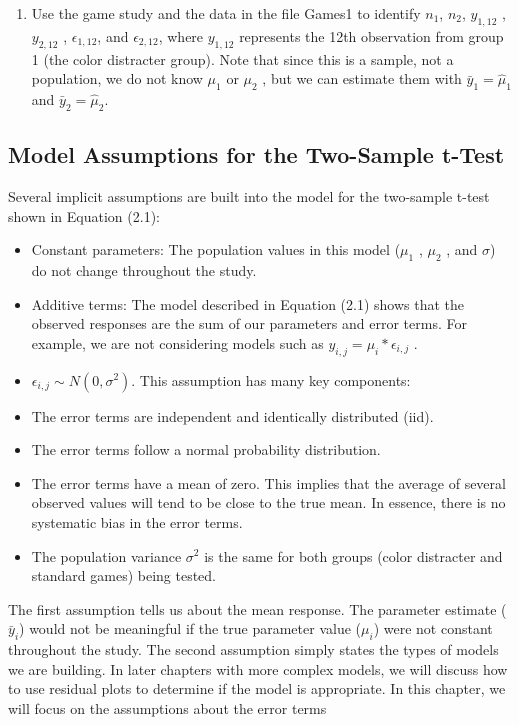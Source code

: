 \documentclass[
]{report}
\providecommand{\tightlist}{%
  \setlength{\itemsep}{0pt}\setlength{\parskip}{0pt}}
\begin{document}
\begin{enumerate}
\def\labelenumi{\arabic{enumi}.}
\setcounter{enumi}{5}
\tightlist
\item
  Use the game study and the data in the file Games1 to identify \(n_1\), \(n_2\), \(y_{1,12}\) , \(y_{2,12}\) , \(\epsilon_{1, 12}\), and \(\epsilon_{2, 12}\),
  where \(y_{1,12}\) represents the 12th observation from group 1 (the color distracter group). Note that since this is a sample, not a population, we do not know \(\mu_1\) or \(\mu_2\) , but we can estimate them with \(\bar{y}_1 = \hat{\mu}_1\) and \(\bar{y}_2 = \hat{\mu}_2\).
\end{enumerate}

\subsection{Model Assumptions for the Two-Sample t-Test}\label{model-assumptions-for-the-two-sample-t-test}

Several implicit assumptions are built into the model for the two-sample t-test shown in Equation (2.1):

\begin{itemize}
\tightlist
\item
  Constant parameters: The population values in this model (\(\mu_1\) , \(\mu_2\) , and \(\sigma\)) do not change throughout the study.
\item
  Additive terms: The model described in Equation (2.1) shows that the observed responses are the sum of our parameters and error terms. For example, we are not considering models such as
  \(y_{i, j} = \mu_i * \epsilon_{i, j}\) .
\item
  \(\epsilon_{i, j} \sim N(0,\sigma^2)\). This assumption has many key components:
\item
  The error terms are independent and identically distributed (iid).
\item
  The error terms follow a normal probability distribution.
\item
  The error terms have a mean of zero. This implies that the average of several observed values will tend to be close to the true mean. In essence, there is no systematic bias in the error terms.
\item
  The population variance \(\sigma^2\) is the same for both groups (color distracter and standard games) being tested.
\end{itemize}

The first assumption tells us about the mean response. The parameter estimate (\(\bar{y}_i\)) would not be meaningful if the true parameter value (\(\mu_i\)) were not constant throughout the study. The second assumption simply states the types of models we are building. In later chapters with more complex models, we will discuss how to use residual plots to determine if the model is appropriate. In this chapter, we will focus on the assumptions about the error terms
\end{document}
